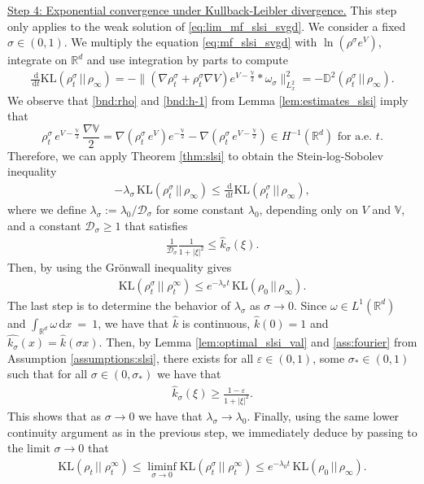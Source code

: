 \documentclass[reqno, 11pt]{amsart}
\numberwithin{equation}{section}
\theoremstyle{definition}
\begin{document}
\underline{Step 4: Exponential convergence under Kullback-Leibler divergence.} This step only applies to the weak solution of \eqref{eq:lim_mf_slsi_svgd}. We consider a fixed $\sigma\in (0,1)$. We multiply the equation \eqref{eq:mf_slsi_svgd} with $\ln(\rho^\sigma e^V)$, integrate on $\mathbb{R}^{d}$ and use integration by parts to compute
\begin{align*}
    \frac{\,\mathrm{d}}{\,\mathrm{d} t}\mathrm{KL}(\rho_t^\sigma\,||\,\rho_\infty)
    =-\|(\nabla\rho_t^\sigma+\rho_t^\sigma\nabla V)e^{V-\frac{\mathbb{V}}{2}}\ast\omega_\sigma\|_{L_{x}^2}^2
    =-\mathbb{D}^2(\rho_t^\sigma\,||\,\rho_\infty).
\end{align*}
We observe that \ref{bnd:rho} and \ref{bnd:h-1} from Lemma \ref{lem:estimates_slsi} imply that
$$
\rho_t^\sigma\, e^{V-\frac{\mathbb{V}}{2}} \, \frac{\nabla \mathbb{V}}{2} = \nabla(\rho_t^\sigma\, e^V) e^{-\frac{\mathbb{V}}{2}} - \nabla(\rho_t^\sigma\, e^{V-\frac{\mathbb{V}}{2}}) \in H^{-1}(\mathbb{R}^{d}) \mbox{ for a.e. } t.
$$
Therefore, we can apply Theorem \ref{thm:slsi} to obtain the Stein-log-Sobolev inequality
\begin{align*}
    -\lambda_\sigma\,\mathrm{KL}(\rho_t^\sigma\,||\,\rho_\infty)
    \leq \frac{\,\mathrm{d}}{\,\mathrm{d} t}\mathrm{KL}(\rho_t^\sigma\,||\,\rho_\infty),
\end{align*}
where we define $\lambda_\sigma:=\lambda_0/\mathcal{D}_\sigma$ for some constant $\lambda_0$, depending only on $V$ and $\mathbb{V}$, and a constant $\mathcal{D}_\sigma\geq 1$ that satisfies
\begin{align*}
    \frac{1}{\mathcal{D}_\sigma}\frac{1}{1+|\xi|^2}
    \leq \hat{k}_\sigma(\xi).
\end{align*}
Then, by using the Gr\"onwall inequality gives
\begin{align*}
    \mathrm{KL}(\rho_t^\sigma \,||\; \rho_t^\infty)\leq e^{-\lambda_\sigma t}\,\mathrm{KL}(\rho_0\,||\,\rho_\infty).
\end{align*}
The last step is to determine the behavior of $\lambda_\sigma$ as $\sigma\to 0$. Since $\omega\in L^1(\mathbb{R}^{d})$ and $\int_{\mathbb{R}^{d}}\omega\,\mathrm{d} x~=~1$, we have that $\hat{k}$ is continuous, $\hat{k}(0)=1$ and $\widehat{k_\sigma}(x)=\hat{k}(\sigma x)$. Then, by Lemma \ref{lem:optimal_slsi_val} and \eqref{ass:fourier} from Assumption \ref{assumptions:slsi}, there exists for all $\varepsilon\in (0,1)$, some $\sigma_\ast\in (0,1)$ such that for all $\sigma\in (0,\sigma_\ast)$ we have that
\begin{align*}
    \hat{k}_\sigma(\xi)\geq \frac{1-\varepsilon}{1+|\xi|^2}.
\end{align*}
This shows that as $\sigma\to 0$ we have that $\lambda_\sigma\to\lambda_0$. Finally, using the same lower continuity argument as in the previous step, we immediately deduce by passing to the limit $\sigma\rightarrow 0$ that
\begin{align*}
    \mathrm{KL}(\rho_t \,||\; \rho_t^\infty)\leq\liminf_{\sigma \rightarrow 0}\mathrm{KL}(\rho_t^\sigma \,||\; \rho_t^\infty)\leq e^{-\lambda_0 t}\,\mathrm{KL}(\rho_0\,||\,\rho_\infty).
\end{align*}
\end{document}
